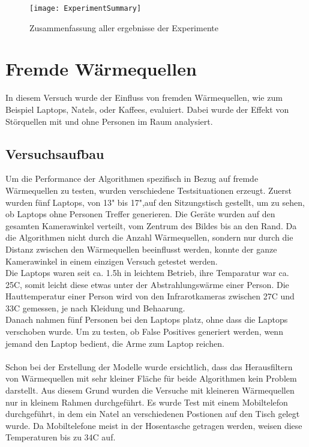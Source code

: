 \begin{figure}[H]
	\centering
	\texttt{[image: ExperimentSummary]}
	\caption{Zusammenfassung aller ergebnisse der Experimente}
	\label{fig:ExperimentSummary}
\end{figure}



\section{Fremde Wärmequellen}
\label{sec:FremdeWärmequellen}

In diesem Versuch wurde der Einfluss von fremden Wärmequellen, wie zum Beispiel Laptops, Natels, oder Kaffees, evaluiert. Dabei wurde der Effekt von Störquellen mit und ohne Personen im Raum analysiert.

\subsection{Versuchsaufbau}

Um die Performance der Algorithmen spezifisch in Bezug auf fremde Wärmequellen zu testen, wurden verschiedene Testsituationen erzeugt. Zuerst wurden fünf Laptops, von 13" bis 17",auf den Sitzungstisch gestellt, um zu sehen, ob Laptops ohne Personen Treffer generieren. Die Geräte wurden auf den gesamten Kamerawinkel verteilt, vom Zentrum des Bildes bis an den Rand. Da die Algorithmen nicht durch die Anzahl Wärmequellen, sondern nur durch die Distanz zwischen den Wärmequellen beeinflusst werden, konnte der ganze Kamerawinkel in einem einzigen Versuch getestet werden.\\
Die Laptops waren seit ca. 1.5h in leichtem Betrieb, ihre Temparatur war ca. 25\degree C, somit leicht diese etwas unter der Abstrahlungswärme einer Person. Die Hauttemperatur einer Person wird von den Infrarotkameras zwischen 27\degree C und 33\degree C gemessen, je nach Kleidung und Behaarung.\\
Danach nahmen fünf Personen bei den Laptops platz,  ohne dass die Laptops verschoben wurde. Um zu testen, ob False Positives generiert werden, wenn jemand den Laptop bedient, die Arme zum Laptop reichen.\\
\\
Schon bei der Erstellung der Modelle wurde ersichtlich, dass das Herausfiltern von Wärmequellen mit sehr kleiner Fläche für beide Algorithmen kein Problem darstellt. Aus diesem Grund wurden die Versuche mit kleineren Wärmequellen nur in kleinem Rahmen durchgeführt. Es wurde Test mit einem Mobiltelefon durchgeführt, in dem ein Natel an verschiedenen Postionen auf den Tisch gelegt wurde. Da Mobiltelefone meist in der Hosentasche getragen werden, weisen diese Temperaturen bis zu 34\degree C auf.\\
\\

